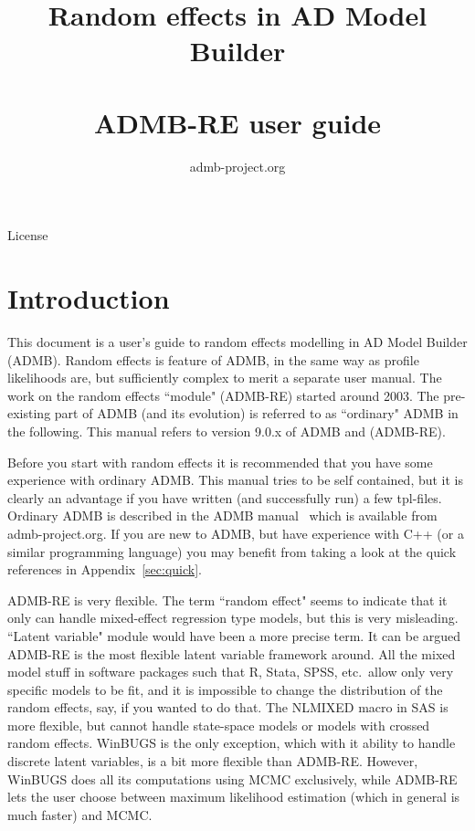 \documentclass[12pt,letter,reqno]{book}
\begin{document}
\title{ Random effects in AD Model Builder\\~ \\
	ADMB-RE user guide}
\author{admb-project.org}

\maketitle

\centerline{\LARGE License}



\newpage

\tableofcontents

\chapter{Introduction}

This document is a user's guide to random effects modelling in AD Model Builder (ADMB).
Random effects is feature of ADMB, in the same way as profile likelihoods are, 
but sufficiently complex to merit a separate user manual. The work on the random effects ``module" (ADMB-RE) 
started around 2003. The pre-existing part of ADMB (and its evolution) is referred to as ``ordinary" ADMB
in the following. This manual refers to version 9.0.x of ADMB and (ADMB-RE).

Before you start with random effects it is recommended that you have some experience
with ordinary ADMB. This manual tries to be self contained, but it is clearly an advantage if
you have written (and successfully run) a few tpl-files. Ordinary ADMB is described in 
the ADMB manual~\cite{admb_manual} which is available from admb-project.org.
If you are new to ADMB, but have experience with C++ (or a similar programming language)
you may benefit from taking a look at the quick references in Appendix~\ref{sec:quick}.

ADMB-RE is very flexible. The term ``random effect" seems to indicate that it only can handle mixed-effect
regression type models, but this is very misleading. ``Latent variable" module would have
been a more precise term. It can be argued ADMB-RE is the most flexible latent variable framework around.
All the mixed model stuff in software packages such that R, Stata, SPSS, etc.~allow only very specific models
to be fit, and it is impossible to change the distribution of the random effects, say, if you wanted to do that.
The NLMIXED macro in SAS is more flexible, but cannot handle state-space models or models with crossed
random effects. WinBUGS is the only exception, which with it ability to handle discrete
latent variables, is a bit more flexible than ADMB-RE. However, WinBUGS does all its computations using MCMC exclusively,
while ADMB-RE lets the user choose between maximum likelihood estimation (which in general is much faster) and MCMC.
\end{document}
